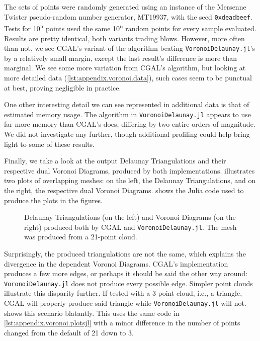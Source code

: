 The sets of points were randomly generated using an instance of the Mersenne
Twister pseudo-random number generator, MT19937, with the seed
\texttt{0xdeadbeef}.  Tests for 10\textsuperscript{n} points used the same
10\textsuperscript{n} random points for every sample evaluated.  Results are
pretty identical, both variants trading blows.  However, more often than not, we
see \ac{CGAL}'s variant of the algorithm beating \texttt{VoronoiDelaunay.jl}'s
by a relatively small margin, except the last result's difference is more than
marginal.  We see some more variation from \ac{CGAL}'s algorithm, but looking at
more detailed data (\cref{lst:appendix.voronoi.data}), such cases seem to be
punctual at best, proving negligible in practice.

One other interesting detail we can see represented in additional data is that
of estimated memory usage.  The algorithm in \texttt{VoronoiDelaunay.jl} appears
to use far more memory than \ac{CGAL}'s does, differing by two entire orders of
magnitude.  We did not investigate any further, though additional profiling
could help bring light to some of these results.

Finally, we take a look at the output Delaunay Triangulations and their
respective dual Voronoi Diagrams, produced by both implementations.
 illustrates two plots of overlapping meshes: on
the left, the Delaunay Triangulations, and on the right, the respective dual
Voronoi Diagrams.   shows the Julia code used
to produce the plots in the figures.

\begin{figure}[!htb]
  \resizebox{\linewidth}{!}{}
  \caption[Voronoi Delaunay output comparison]{
    Delaunay Triangulations (on the left) and Voronoi Diagrams (on the right)
    produced both by \ac{CGAL} and \texttt{VoronoiDelaunay.jl}.  The mesh was
    produced from a 21-point cloud.}%
  \label{fig:eval.voronoi.output}
\end{figure}

Surprisingly, the produced triangulations are not the same, which explains the
divergence in the dependent Voronoi Diagrams.  \Ac{CGAL}'s implementation
produces a few more edges, or perhaps it should be said the other way around:
\texttt{VoronoiDelaunay.jl} does not produce every possible edge.  Simpler point
clouds illustrate this disparity further.  If tested with a 3-point cloud, i.e.,
a triangle, \ac{CGAL} will properly produce said triangle while
\texttt{VoronoiDelaunay.jl} will not.   shows
this scenario blatantly.  This uses the same code in
\cref{lst:appendix.voronoi.plotsjl} with a minor difference in the number of
points changed from the default of 21 down to 3.

